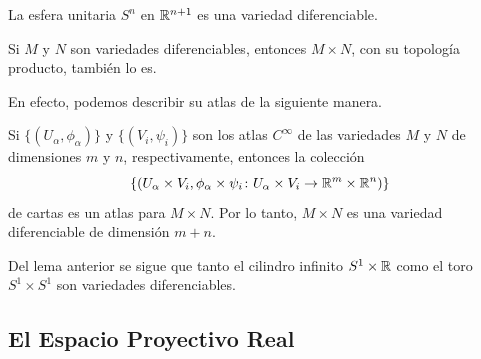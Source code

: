 \begin{example}
	La esfera unitaria $S^{n}$ en $\mathbb{R}^{n+1}$ es una variedad diferenciable.
\end{example}

\begin{example}
	Si $M$ y $N$ son variedades diferenciables, entonces $M \times N$, con su topología producto, también lo es.
\end{example}

En efecto, podemos describir su atlas de la siguiente manera.

\begin{lemma}\label{Producto de Variedades}
	Si $\{ (U_{\alpha}, \phi_{\alpha}) \}$ y $\{ (V_{i}, \psi_{i}) \}$ son los atlas $C^{\infty}$ de las variedades $M$ y $N$ de dimensiones $m$ y $n$, respectivamente, entonces la colección
	\[ \{ (U_{\alpha} \times V_{i}, \phi_{\alpha} \times \psi_{i} \colon U_{\alpha} \times V_{i} \to \mathbb{R}^{m} \times \mathbb{R}^{n}) \} \]
	de cartas es un atlas para $M \times N$. Por lo tanto, $M \times N$ es una variedad diferenciable de dimensión $m + n$.
\end{lemma}

\begin{example}
	Del lema anterior se sigue que tanto el cilindro infinito $S^{1} \times \mathbb{R}$ como el toro $S^{1} \times S^{1}$ son variedades diferenciables.
\end{example}

\subsection{El Espacio Proyectivo Real}

